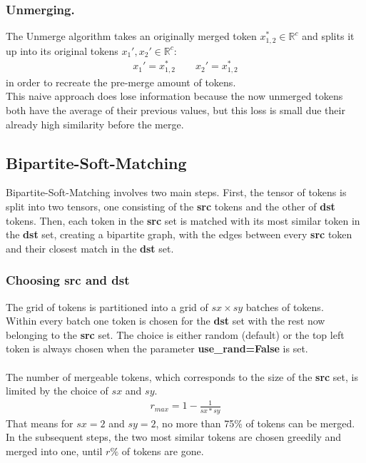 \subsubsection*{Unmerging.} The Unmerge algorithm takes an originally merged token $x_{1,2}^* \in \mathbb{R}^c$ and splits it up into its original tokens $x_1', x_2' \in \mathbb{R}^c$: 
\begin{align*}
    x_1' = x_{1,2}^* \quad\quad
    x_2' = x_{1,2}^*
\end{align*}
in order to recreate the pre-merge amount of tokens.\\
This naive approach does lose information because the now unmerged tokens both have the average of their previous values, but this loss is small due their already high similarity before the merge.



\subsection{Bipartite-Soft-Matching}
Bipartite-Soft-Matching involves two main steps. First, the tensor of tokens is split into two tensors, one consisting of the \textbf{src} tokens and the other of \textbf{dst} tokens. Then, each token in the \textbf{src} set is matched with its most similar token in the \textbf{dst} set, creating a bipartite graph, with the edges between every \textbf{src} token and their closest match in the \textbf{dst} set. 



\subsubsection*{Choosing src and dst}
The grid of tokens is partitioned into a grid of \(sx \times sy\) batches of tokens.\\
Within every batch one token is chosen for the \textbf{dst} set with the rest now belonging to the \textbf{src} set. The choice is either random (default) or the top left token is always chosen when the parameter \textbf{use\_rand=False} is set.\\
\\
The number of mergeable tokens, which corresponds to the size of the \textbf{src} set, is limited by the choice of \(sx\) and \(sy\).
\begin{align*}
    r_{max} = 1-\frac{1}{sx*sy}
\end{align*}
That means for \(sx = 2\) and \(sy = 2\), no more than 75\% of tokens can be merged.\\
In the subsequent steps, the two most similar tokens are chosen greedily and merged into one, until \(r\%\) of tokens are gone.



